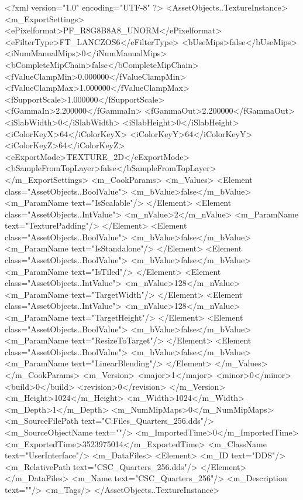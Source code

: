<?xml version="1.0" encoding="UTF-8" ?>
<AssetObjects..TextureInstance>
	<m_ExportSettings>
		<ePixelformat>PF_R8G8B8A8_UNORM</ePixelformat>
		<eFilterType>FT_LANCZOS6</eFilterType>
		<bUseMips>false</bUseMips>
		<iNumManualMips>0</iNumManualMips>
		<bCompleteMipChain>false</bCompleteMipChain>
		<fValueClampMin>0.000000</fValueClampMin>
		<fValueClampMax>1.000000</fValueClampMax>
		<fSupportScale>1.000000</fSupportScale>
		<fGammaIn>2.200000</fGammaIn>
		<fGammaOut>2.200000</fGammaOut>
		<iSlabWidth>0</iSlabWidth>
		<iSlabHeight>0</iSlabHeight>
		<iColorKeyX>64</iColorKeyX>
		<iColorKeyY>64</iColorKeyY>
		<iColorKeyZ>64</iColorKeyZ>
		<eExportMode>TEXTURE_2D</eExportMode>
		<bSampleFromTopLayer>false</bSampleFromTopLayer>
	</m_ExportSettings>
	<m_CookParams>
		<m_Values>
			<Element class="AssetObjects..BoolValue">
				<m_bValue>false</m_bValue>
				<m_ParamName text="IsScalable"/>
			</Element>
			<Element class="AssetObjects..IntValue">
				<m_nValue>2</m_nValue>
				<m_ParamName text="TexturePadding"/>
			</Element>
			<Element class="AssetObjects..BoolValue">
				<m_bValue>false</m_bValue>
				<m_ParamName text="IsStandalone"/>
			</Element>
			<Element class="AssetObjects..BoolValue">
				<m_bValue>false</m_bValue>
				<m_ParamName text="IsTiled"/>
			</Element>
			<Element class="AssetObjects..IntValue">
				<m_nValue>128</m_nValue>
				<m_ParamName text="TargetWidth"/>
			</Element>
			<Element class="AssetObjects..IntValue">
				<m_nValue>128</m_nValue>
				<m_ParamName text="TargetHeight"/>
			</Element>
			<Element class="AssetObjects..BoolValue">
				<m_bValue>false</m_bValue>
				<m_ParamName text="ResizeToTarget"/>
			</Element>
			<Element class="AssetObjects..BoolValue">
				<m_bValue>false</m_bValue>
				<m_ParamName text="LinearBlending"/>
			</Element>
		</m_Values>
	</m_CookParams>
	<m_Version>
		<major>1</major>
		<minor>0</minor>
		<build>0</build>
		<revision>0</revision>
	</m_Version>
	<m_Height>1024</m_Height>
	<m_Width>1024</m_Width>
	<m_Depth>1</m_Depth>
	<m_NumMipMaps>0</m_NumMipMaps>
	<m_SourceFilePath text="C:\Users\Shadow\Desktop\Working Files\Icons\Quarters\CSC_Quarters_256.dds"/>
	<m_SourceObjectName text=""/>
	<m_ImportedTime>0</m_ImportedTime>
	<m_ExportedTime>3523975014</m_ExportedTime>
	<m_ClassName text="UserInterface"/>
	<m_DataFiles>
		<Element>
			<m_ID text="DDS"/>
			<m_RelativePath text="CSC_Quarters_256.dds"/>
		</Element>
	</m_DataFiles>
	<m_Name text="CSC_Quarters_256"/>
	<m_Description text=""/>
	<m_Tags/>
</AssetObjects..TextureInstance>

